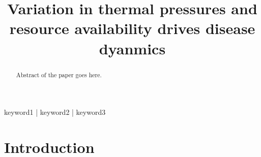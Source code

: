 
\title{Variation in thermal pressures and resource availability drives disease dyanmics}

\author[1]{
  
}
\date{}

\maketitle

\begin{abstract}
Abstract of the paper goes here.
\lipsum[1]
\end{abstract}

\begin{keywords}
keyword1 | keyword2 | keyword3
\end{keywords}

\begin{corrauthor}
\end{corrauthor}

\section*{Introduction}\label{s:introduction}

